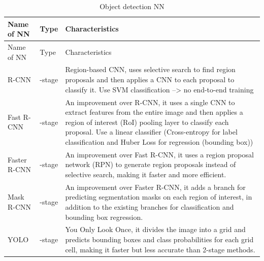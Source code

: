 \documentclass[
  a4paper,
  ,captions=tableheading
]{scrartcl}
\begin{document}
\begin{longtable}[]{@{}
  >{\raggedright\arraybackslash}p{}
  >{\raggedright\arraybackslash}p{}
  >{\raggedright\arraybackslash}p{}@{}}
\caption{Object detection NN}\tabularnewline
\toprule\noalign{}
\begin{minipage}[b]{\linewidth}\raggedright
Name of NN
\end{minipage} & \begin{minipage}[b]{\linewidth}\raggedright
Type
\end{minipage} & \begin{minipage}[b]{\linewidth}\raggedright
Characteristics
\end{minipage} \\
\midrule\noalign{}
\endfirsthead
\toprule\noalign{}
\begin{minipage}[b]{\linewidth}\raggedright
Name of NN
\end{minipage} & \begin{minipage}[b]{\linewidth}\raggedright
Type
\end{minipage} & \begin{minipage}[b]{\linewidth}\raggedright
Characteristics
\end{minipage} \\
\midrule\noalign{}
\endhead
\bottomrule\noalign{}
\endlastfoot
R-CNN & 2-stage & Region-based CNN, uses selective search to find region
proposals and then applies a CNN to each proposal to classify it. Use
SVM classification --\textgreater{} no end-to-end training \\
Fast R-CNN & 2-stage & An improvement over R-CNN, it uses a single CNN
to extract features from the entire image and then applies a region of
interest (RoI) pooling layer to classify each proposal. Use a linear
classifier (Cross-entropy for label classification and Huber Loss for
regression (bounding box)) \\
Faster R-CNN & 2-stage & An improvement over Fast R-CNN, it uses a
region proposal network (RPN) to generate region proposals instead of
selective search, making it faster and more efficient. \\
Mask R-CNN & 2-stage & An improvement over Faster R-CNN, it adds a
branch for predicting segmentation masks on each region of interest, in
addition to the existing branches for classification and bounding box
regression. \\
YOLO & 1-stage & You Only Look Once, it divides the image into a grid
and predicts bounding boxes and class probabilities for each grid cell,
making it faster but less accurate than 2-stage methods. \\
\end{longtable}
\end{document}
